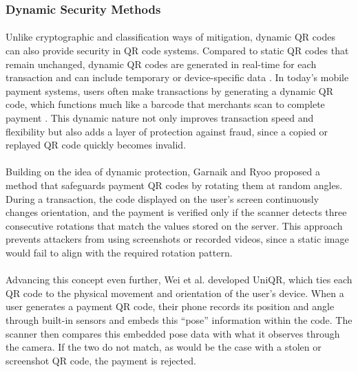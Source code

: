 \documentclass[a4paper]{scl-article}
\begin{document}
\subsubsection{Dynamic Security Methods}
\label{sect:rrl_3c}
\paragraph{}Unlike cryptographic and classification ways of mitigation, dynamic QR codes can also provide security in QR code systems. Compared to static QR codes that remain unchanged, dynamic QR codes are generated in real-time for each transaction and can include temporary or device-specific data \cite{choudhary2023}. In today’s mobile payment systems, users often make transactions by generating a dynamic QR code, which functions much like a barcode that merchants scan to complete payment \cite{garnaik2022, wei2024}. This dynamic nature not only improves transaction speed and flexibility but also adds a layer of protection against fraud, since a copied or replayed QR code quickly becomes invalid. 

\paragraph{}Building on the idea of dynamic protection, Garnaik and Ryoo \cite{garnaik2022} proposed a method that safeguards payment QR codes by rotating them at random angles. During a transaction, the code displayed on the user’s screen continuously changes orientation, and the payment is verified only if the scanner detects three consecutive rotations that match the values stored on the server. This approach prevents attackers from using screenshots or recorded videos, since a static image would fail to align with the required rotation pattern.

\paragraph{}Advancing this concept even further, Wei et al. \cite{wei2024} developed UniQR, which ties each QR code to the physical movement and orientation of the user’s device. When a user generates a payment QR code, their phone records its position and angle through built-in sensors and embeds this “pose” information within the code. The scanner then compares this embedded pose data with what it observes through the camera. If the two do not match, as would be the case with a stolen or screenshot QR code, the payment is rejected. 
\end{document}
